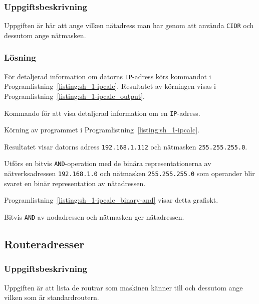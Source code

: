 \subsubsection{Uppgiftsbeskrivning}
Uppgiften är här att ange vilken nätadress man har genom att använda
\texttt{CIDR} och dessutom ange nätmasken.


\subsubsection{Lösning}
För detaljerad information om datorns \texttt{IP}-adress körs kommandot i
Programlistning~\ref{listing:sh_1-ipcalc}. Resultatet av körningen visas i
Programlistning~\ref{listing:sh_1-ipcalc_output}.

\begin{listing}[H]
  \caption{Kommando för att visa detaljerad information om en
           \texttt{IP}-adress.}
  \label{listing:sh_1-ipcalc}
\end{listing}

\begin{listing}[H]
  \caption{Körning av programmet i Programlistning~\ref{listing:sh_1-ipcalc}.}
  \label{listing:sh_1-ipcalc_output}
\end{listing}


Resultatet visar datorns adress \texttt{192.168.1.112} och nätmasken
\texttt{255.255.255.0}.  

Utförs en bitvis \texttt{AND}-operation med de binära representationerna av
nätverksadressen \texttt{192.168.1.0} och nätmasken \texttt{255.255.255.0} som
operander blir svaret en binär representation av nätadressen.

Programlistning~\ref{listing:sh_1-ipcalc_binary-and} visar detta grafiskt.

\begin{listing}[H]
  \caption{Bitvis \texttt{AND} av nodadressen och nätmasken ger nätadressen.}
  \label{listing:sh_1-ipcalc_binary-and}
\end{listing}



\subsection{Routeradresser}
\subsubsection{Uppgiftsbeskrivning}
Uppgiften är att lista de routrar som maskinen känner till och dessutom ange
vilken som är standardroutern.



